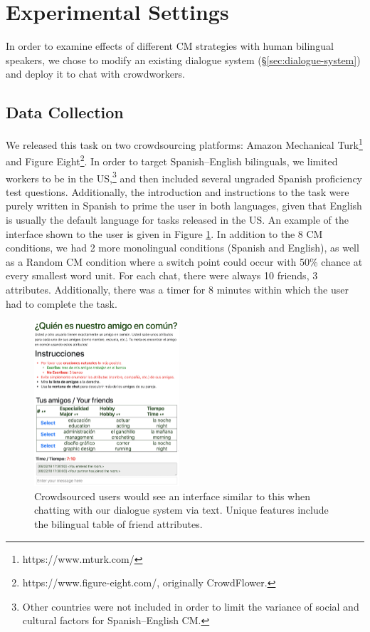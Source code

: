 \documentclass[11pt,a4paper]{article}
\newcommand{\Sref}[1]{\S\ref{#1}}
\begin{document}
\section{Experimental Settings}
\label{sec:experiment}
In order to examine effects of different CM strategies with human bilingual speakers, we chose to modify an existing dialogue system (\Sref{sec:dialogue-system}) and deploy it to chat with crowdworkers.

\subsection{Data Collection}

We released this task on two crowdsourcing platforms: Amazon Mechanical Turk\footnote{https://www.mturk.com/} and Figure Eight\footnote{https://www.figure-eight.com/, originally CrowdFlower.}. 
In order to target Spanish--English bilinguals, we limited workers to be in the US,\footnote{Other countries were not included in order to limit the variance of social and cultural factors for Spanish--English CM.} and then included several ungraded Spanish proficiency test questions. 
Additionally, the introduction and instructions to the task were purely written in Spanish to prime the user in both languages, given that English is usually the default language for tasks released in the US. 
An example of the interface shown to the user is given in Figure \ref{fig:interface}. 
In addition to the 8 CM conditions, we had 2 more monolingual conditions (Spanish and English), as well as a Random CM condition where a switch point could occur with 50\% chance at every smallest word unit.
For each chat, there were always 10 friends, 3 attributes. Additionally, there was a timer for 8 minutes within which the user had to complete the task.

\begin{figure}
    \centering
	\includegraphics[width=0.48\textwidth]{img/interface_1101_2}
  	\caption{Crowdsourced users would see an interface similar to this when chatting with our dialogue system via text. Unique features include the bilingual table of friend attributes.}
    \label{fig:interface}
\end{figure}
\end{document}
